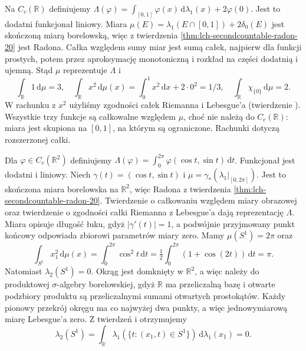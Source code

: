 \begin{przyklad}
Na $C_c(\mathbb R)$ definiujemy $\Lambda(\varphi)=\int_{[0,1]}\varphi(x)\,\mathrm d\lambda_1(x)+2\varphi(0)$. Jest to dodatni funkcjonał liniowy. Miara $\mu(E)=\lambda_1(E\cap[0,1])+2\delta_0(E)$ jest skończoną miarą borelowską, więc z twierdzenia \ref{thm:lch-secondcountable-radon-20} jest Radona. Całka względem sumy miar jest sumą całek, najpierw dla funkcji prostych, potem przez aproksymację monotoniczną i rozkład na części dodatnią i ujemną. Stąd $\mu$ reprezentuje $\Lambda$ i
\[
 \int_{\mathbb R}1\,\mathrm d\mu=3,\quad
 \int_\mathbb R x^2\,\mathrm d\mu(x)=\int_0^1 x^2\,\mathrm dx+2\cdot0^2=1/3,\quad
 \int_\mathbb R\chi_{\{0\}}\,\mathrm d\mu=2.
\]
W rachunku z $x^2$ użyliśmy zgodności całek Riemanna
i Lebesgue'a (twierdzenie ).
Wszystkie trzy funkcje są całkowalne względem $\mu$,
choć nie należą do $C_c(\mathbb R)$: miara jest skupiona na
$[0,1]$, na którym są ograniczone. Rachunki dotyczą rozszerzonej całki.
\end{przyklad}
\begin{przyklad}
Dla $\varphi\in C_c(\mathbb R^2)$ definiujemy $\Lambda(\varphi)=\int_0^{2\pi}\varphi(\cos t,\sin t)\,\mathrm dt$. Funkcjonał jest dodatni i liniowy. Niech $\gamma(t)=(\cos t,\sin t)$ i $\mu=\gamma_*(\lambda_1|_{[0,2\pi]})$. Jest to skończona miara borelowska na $\mathbb R^2$, więc Radona z twierdzenia \ref{thm:lch-secondcountable-radon-20}. Twierdzenie 
o całkowaniu względem miary obrazowej oraz twierdzenie
 o zgodności całki Riemanna
z Lebesgue'a dają reprezentację $\Lambda$. Miara opisuje długość łuku, gdyż $|\gamma'(t)|=1$, a podwójnie przyjmowany punkt końcowy odpowiada zbiorowi parametrów miary zero. Mamy $\mu(S^1)=2\pi$ oraz
\[
 \int_{S^1}x_1^2\,\mathrm d\mu(x)=\int_0^{2\pi}\cos^2t\,\mathrm dt
 =\tfrac12\int_0^{2\pi}(1+\cos(2t))\,\mathrm dt=\pi.
\]
Natomiast $\lambda_2(S^1)=0$. Okrąg jest domknięty
w $\mathbb R^2$, a więc należy do produktowej
$\sigma$-algebry borelowskiej, gdyż $\mathbb R$
ma przeliczalną bazę i otwarte podzbiory produktu
są przeliczalnymi sumami otwartych prostokątów.
Każdy pionowy przekrój okręgu ma co najwyżej dwa punkty,
a więc jednowymiarową miarę Lebesgue'a zero.
Z twierdzeń  i
 otrzymujemy
\[
 \lambda_2(S^1)
 =\int_{\mathbb R}\lambda_1(\{t:(x_1,t)\in S^1\})
      \,\mathrm d\lambda_1(x_1)=0.
\]
\end{przyklad}
